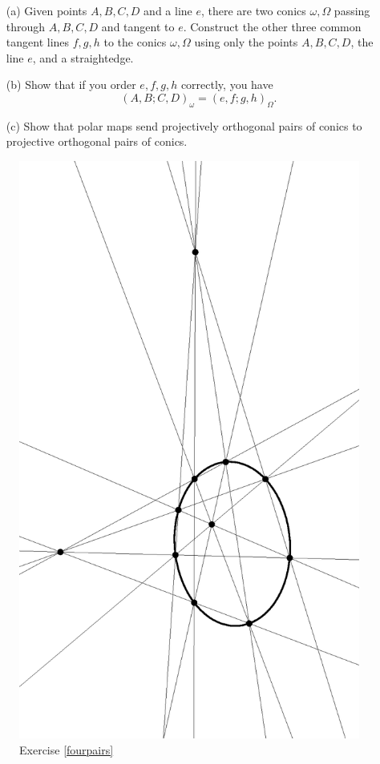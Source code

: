 \begin{exer}\label{conictangents}\hspace{2em}
\begin{itemize}
\item[(a)] Given points $A,B,C,D$ and a line $e$, there are two conics $\omega,\Omega$ passing through $A,B,C,D$ and tangent to $e$. Construct the other three common tangent lines $f,g,h$ to the conics $\omega,\Omega$ using only the points $A,B,C,D$, the line $e$, and a straightedge.

\item[(b)] Show that if you order $e,f,g,h$ correctly, you have
\[
(A,B;C,D)_\omega = (e,f;g,h)_\Omega.
\]

\item[(c)] Show that polar maps send projectively orthogonal pairs of conics to projective orthogonal pairs of conics.
\end{itemize}
\end{exer}

\begin{figure}[!htb]
\centering
\includegraphics[scale=0.5,angle=270]{fourpairs.eps}
\caption{Exercise \ref{fourpairs}}
\end{figure}

